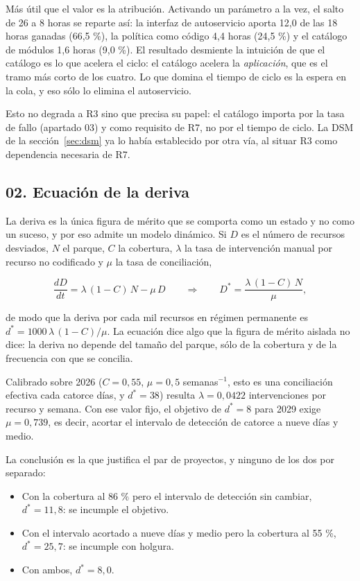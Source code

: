 \documentclass[11pt,letterpaper]{article}
\newcommand{\subsec}[1]{%
  \subsection*{#1}%
  \phantomsection\addcontentsline{toc}{subsection}{#1}}
\begin{document}
Más útil que el valor es la atribución. Activando un parámetro a la vez, el
salto de 26 a 8 horas se reparte así: la interfaz de autoservicio aporta 12,0
de las 18 horas ganadas (66,5 \%), la política como código 4,4 horas (24,5 \%)
y el catálogo de módulos 1,6 horas (9,0 \%). El resultado desmiente la
intuición de que el catálogo es lo que acelera el ciclo: el catálogo acelera
la \emph{aplicación}, que es el tramo más corto de los cuatro. Lo que domina
el tiempo de ciclo es la espera en la cola, y eso sólo lo elimina el
autoservicio.

Esto no degrada a R3 sino que precisa su papel: el catálogo importa por la
tasa de fallo (apartado 03) y como requisito de R7, no por el tiempo de ciclo.
La DSM de la sección~\ref{sec:dsm} ya lo había establecido por otra vía, al
situar R3 como dependencia necesaria de R7.

\subsec{02. Ecuación de la deriva}

La deriva es la única figura de mérito que se comporta como un estado y no
como un suceso, y por eso admite un modelo dinámico. Si $D$ es el número de
recursos desviados, $N$ el parque, $C$ la cobertura, $\lambda$ la tasa de
intervención manual por recurso no codificado y $\mu$ la tasa de conciliación,

\[
\frac{dD}{dt} = \lambda\,(1-C)\,N - \mu\,D
\qquad\Longrightarrow\qquad
D^{*} = \frac{\lambda\,(1-C)\,N}{\mu},
\]

de modo que la deriva por cada mil recursos en régimen permanente es
$d^{*} = 1000\,\lambda\,(1-C)/\mu$. La ecuación dice algo que la figura de
mérito aislada no dice: la deriva no depende del tamaño del parque, sólo de la
cobertura y de la frecuencia con que se concilia.

Calibrado sobre 2026 ($C = 0{,}55$, $\mu = 0{,}5$ semanas$^{-1}$, esto es una
conciliación efectiva cada catorce días, y $d^{*} = 38$) resulta
$\lambda = 0{,}0422$ intervenciones por recurso y semana. Con ese valor fijo,
el objetivo de $d^{*} = 8$ para 2029 exige $\mu = 0{,}739$, es decir, acortar
el intervalo de detección de catorce a nueve días y medio.

La conclusión es la que justifica el par de proyectos, y ninguno de los dos
por separado:

\begin{itemize}
  \item Con la cobertura al 86 \% pero el intervalo de detección sin cambiar,
    $d^{*} = 11{,}8$: se incumple el objetivo.
  \item Con el intervalo acortado a nueve días y medio pero la cobertura al
    55 \%, $d^{*} = 25{,}7$: se incumple con holgura.
  \item Con ambos, $d^{*} = 8{,}0$.
\end{itemize}
\end{document}
